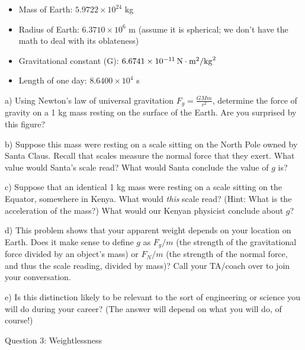 \documentclass[12pt]{article}
\newcommand{\BI}{\begin{itemize}}
\newcommand{\EI}{\end{itemize}}
\begin{document}
\rm
\BI
\item Mass of Earth: $5.9722\times 10^{24}$ kg
\item Radius of Earth: $ 6.3710 \times 10^6$ m (assume it is spherical; we don't have the math to deal with its oblateness)
\item Gravitational constant (G): $6.6741 \times 10^{-11} \,\rm N\cdot \rm m^2/{\rm kg}^2$
\item Length of one day: $8.6400 \times 10^4$ s
\EI


a) Using Newton's law of universal gravitation $F_g=\frac{GMm}{r^2}$, determine the force of gravity on a 1 kg mass resting on the surface of the Earth. Are you surprised by this figure?


\vspace{2in}

b) Suppose this mass were resting on a scale sitting on the North Pole owned by Santa Claus. Recall that scales measure
the normal force that they exert. What value would Santa's scale read? What would Santa conclude the value of $g$ is?

\vspace{2in}
\newpage
c) Suppose that an identical 1 kg mass were resting on a scale sitting on the Equator, somewhere in Kenya. What would {\it this} scale read? (Hint: What is the acceleration of the mass?) What would our Kenyan physicist conclude about $g$?

\vspace{3in}

d) This problem shows that your apparent weight depends on your location on Earth. 
Does it make sense to define $g$ as $F_g/m$ 
(the strength of the gravitational force divided by an object's mass) or
$F_N/m$ (the strength of the normal force, and thus the scale reading, divided by mass)? Call your TA/coach over to join your conversation.

\vspace{2in}

e) Is this distinction likely to be relevant to the sort of engineering or science you will do during your
career? (The answer will depend on what you will do, of course!)


%
%
%
%
%
%
%
%
%
%
%
\newpage
\centerline{\Large Question 3: Weightlessness}
\end{document}
